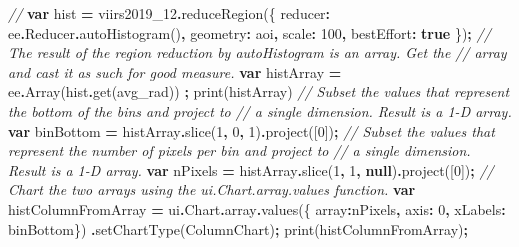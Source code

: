 \documentclass[
]{article}
\newenvironment{Shaded}{\begin{snugshade}}{\end{snugshade}}
\newcommand{\AttributeTok}[1]{\textcolor[rgb]{0.77,0.63,0.00}{#1}}
\newcommand{\CommentTok}[1]{\textcolor[rgb]{0.56,0.35,0.01}{\textit{#1}}}
\newcommand{\DataTypeTok}[1]{\textcolor[rgb]{0.13,0.29,0.53}{#1}}
\newcommand{\DecValTok}[1]{\textcolor[rgb]{0.00,0.00,0.81}{#1}}
\newcommand{\FunctionTok}[1]{\textcolor[rgb]{0.00,0.00,0.00}{#1}}
\newcommand{\KeywordTok}[1]{\textcolor[rgb]{0.13,0.29,0.53}{\textbf{#1}}}
\newcommand{\NormalTok}[1]{#1}
\newcommand{\OperatorTok}[1]{\textcolor[rgb]{0.81,0.36,0.00}{\textbf{#1}}}
\newcommand{\StringTok}[1]{\textcolor[rgb]{0.31,0.60,0.02}{#1}}
\begin{document}
\begin{Shaded}
\begin{Highlighting}[]
\CommentTok{// }
\KeywordTok{var}\NormalTok{ hist }\OperatorTok{=}\NormalTok{ viirs2019\_12}\OperatorTok{.}\FunctionTok{reduceRegion}\NormalTok{(\{}
  \DataTypeTok{reducer}\OperatorTok{:}\NormalTok{ ee}\OperatorTok{.}\AttributeTok{Reducer}\OperatorTok{.}\FunctionTok{autoHistogram}\NormalTok{()}\OperatorTok{,}
  \DataTypeTok{geometry}\OperatorTok{:}\NormalTok{ aoi}\OperatorTok{,}
  \DataTypeTok{scale}\OperatorTok{:} \DecValTok{100}\OperatorTok{,}
  \DataTypeTok{bestEffort}\OperatorTok{:} \KeywordTok{true}
\NormalTok{\})}\OperatorTok{;}
\CommentTok{// The result of the region reduction by \textasciigrave{}autoHistogram\textasciigrave{} is an array. Get the}
\CommentTok{// array and cast it as such for good measure.}
\KeywordTok{var}\NormalTok{ histArray }\OperatorTok{=}\NormalTok{ ee}\OperatorTok{.}\FunctionTok{Array}\NormalTok{(hist}\OperatorTok{.}\FunctionTok{get}\NormalTok{(}\StringTok{\textquotesingle{}avg\_rad\textquotesingle{}}\NormalTok{)) }\OperatorTok{;}
\FunctionTok{print}\NormalTok{(histArray)}
\CommentTok{// Subset the values that represent the bottom of the bins and project to}
\CommentTok{// a single dimension. Result is a 1{-}D array.}
\KeywordTok{var}\NormalTok{ binBottom }\OperatorTok{=}\NormalTok{ histArray}\OperatorTok{.}\FunctionTok{slice}\NormalTok{(}\DecValTok{1}\OperatorTok{,} \DecValTok{0}\OperatorTok{,} \DecValTok{1}\NormalTok{)}\OperatorTok{.}\FunctionTok{project}\NormalTok{([}\DecValTok{0}\NormalTok{])}\OperatorTok{;}
\CommentTok{// Subset the values that represent the number of pixels per bin and project to}
\CommentTok{// a single dimension. Result is a 1{-}D array.}
\KeywordTok{var}\NormalTok{ nPixels }\OperatorTok{=}\NormalTok{ histArray}\OperatorTok{.}\FunctionTok{slice}\NormalTok{(}\DecValTok{1}\OperatorTok{,} \DecValTok{1}\OperatorTok{,} \KeywordTok{null}\NormalTok{)}\OperatorTok{.}\FunctionTok{project}\NormalTok{([}\DecValTok{0}\NormalTok{])}\OperatorTok{;}
\CommentTok{// Chart the two arrays using the \textasciigrave{}ui.Chart.array.values\textasciigrave{} function.}
\KeywordTok{var}\NormalTok{ histColumnFromArray }\OperatorTok{=}\NormalTok{ ui}\OperatorTok{.}\AttributeTok{Chart}\OperatorTok{.}\AttributeTok{array}\OperatorTok{.}\FunctionTok{values}\NormalTok{(\{}
  \DataTypeTok{array}\OperatorTok{:}\NormalTok{nPixels}\OperatorTok{,}
  \DataTypeTok{axis}\OperatorTok{:} \DecValTok{0}\OperatorTok{,}
  \DataTypeTok{xLabels}\OperatorTok{:}\NormalTok{ binBottom\})}
  \OperatorTok{.}\FunctionTok{setChartType}\NormalTok{(}\StringTok{\textquotesingle{}ColumnChart\textquotesingle{}}\NormalTok{)}\OperatorTok{;}
\FunctionTok{print}\NormalTok{(histColumnFromArray)}\OperatorTok{;}
\end{Highlighting}
\end{Shaded}
\end{document}
